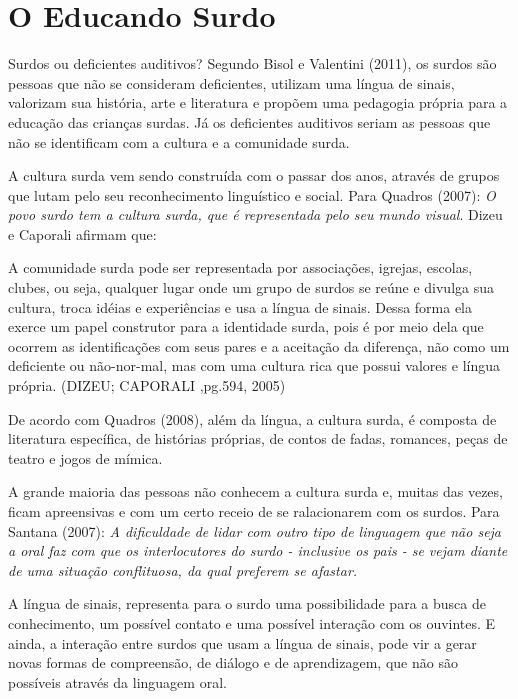 \documentclass[brasil]{abnt}
\begin{document}
\chapter{O Educando Surdo}
		Surdos ou deficientes auditivos? Segundo Bisol e Valentini (2011), os surdos são pessoas que não se consideram deficientes, utilizam uma língua de sinais, valorizam sua história, arte e literatura 
		e propõem uma pedagogia própria para a educação das crianças surdas. Já os deficientes auditivos seriam as pessoas que não se identificam com a cultura e a comunidade surda. 
				
		A cultura surda vem sendo construída com o passar dos anos, através de grupos que lutam pelo seu reconhecimento linguístico e social. 
		Para Quadros (2007): \textit{O povo surdo tem a cultura surda, que é representada pelo seu mundo visual}. Dizeu e Caporali afirmam que:
		
			\begin{citacao}A comunidade surda pode ser representada por associações, igrejas, escolas, clubes, ou seja, qualquer lugar onde um grupo de surdos se reúne e divulga sua cultura, troca idéias e 
							experiências e usa a língua de sinais. Dessa forma ela exerce um papel construtor para a identidade surda, pois é por meio dela que ocorrem as identificações com seus pares e a 
							aceitação da diferença, não como um deficiente ou não-nor-mal, mas com uma cultura rica que possui valores e língua própria. (DIZEU; CAPORALI ,pg.594, 2005)
			\end{citacao}
		
		De acordo com Quadros (2008), além da língua, a cultura surda, é composta de literatura específica, de histórias próprias, de contos de fadas, romances, peças de teatro e jogos de mímica.  
		
		A grande maioria das pessoas não conhecem a cultura surda e, muitas das vezes, ficam apreensivas e com um certo receio de se ralacionarem com os surdos. Para Santana (2007): \textit{A dificuldade de lidar com outro tipo de linguagem que não seja a oral faz com que os interlocutores do surdo - inclusive os pais - 
		se vejam diante de uma situação conflituosa, da qual preferem se afastar.}		

		A língua de sinais, representa para o surdo uma possibilidade para a busca de conhecimento, um possível contato e uma possível interação com os ouvintes.
		E ainda, a interação entre surdos que usam a língua de sinais, pode vir a gerar novas formas de compreensão, de diálogo e de aprendizagem, que não são possíveis através da linguagem oral.
		
\end{document}
